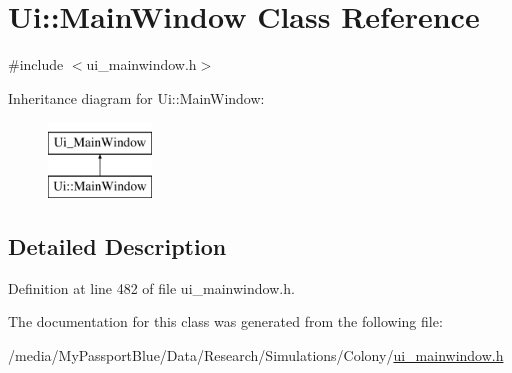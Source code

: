 \hypertarget{class_ui_1_1_main_window}{\section{\-Ui\-:\-:\-Main\-Window \-Class \-Reference}
\label{class_ui_1_1_main_window}
}


{\ttfamily \#include $<$ui\-\_\-mainwindow.\-h$>$}

\-Inheritance diagram for \-Ui\-:\-:\-Main\-Window\-:\begin{figure}[H]
\begin{center}
\leavevmode
\includegraphics[height=2.000000cm]{class_ui_1_1_main_window}
\end{center}
\end{figure}


\subsection{\-Detailed \-Description}


\-Definition at line 482 of file ui\-\_\-mainwindow.\-h.



\-The documentation for this class was generated from the following file\-:\begin{DoxyCompactItemize}
\item 
/media/\-My\-Passport\-Blue/\-Data/\-Research/\-Simulations/\-Colony/\hyperlink{ui__mainwindow_8h}{ui\-\_\-mainwindow.\-h}\end{DoxyCompactItemize}
